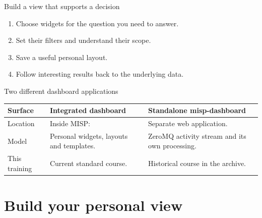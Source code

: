 \begin{frame}[t,plain]
    \titlepage
\end{frame}

\begin{frame}{Build a view that supports a decision}
    \begin{enumerate}
        \item Choose widgets for the question you need to answer.
        \item Set their filters and understand their scope.
        \item Save a useful personal layout.
        \item Follow interesting results back to the underlying data.
    \end{enumerate}
\end{frame}

\begin{frame}{Two different dashboard applications}
    \small
    \begin{tabular}{@{}P{3cm}P{3.6cm}P{3.6cm}@{}}
        \toprule
        Surface & Integrated dashboard & Standalone misp-dashboard \\
        \midrule
        Location & Inside MISP:  & Separate web application. \\
        Model & Personal widgets, layouts and templates. & ZeroMQ activity stream and its own processing. \\
        This training & Current standard course. & Historical course in the archive. \\
        \bottomrule
    \end{tabular}
\end{frame}

\section{Build your personal view}

